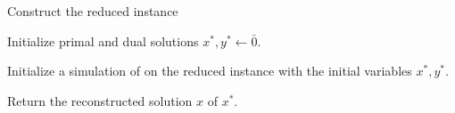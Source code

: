 \documentclass[11pt]{article}
\begin{document}
{\begin{algorithm}[h]
	\caption{$\textsf{Deterministic Weighted}$}
	\label{alg:weighted}
	
			 Construct the reduced instance 
	
	Initialize primal and dual solutions $x^*,y^* \leftarrow \bar{0}$. 
	

	
	Initialize a simulation of  on the reduced instance with the initial variables $x^*,y^*$. 
	

	
	

	Return the reconstructed solution $x$ of $x^*$. 
	
\end{algorithm}




}
\end{document}
